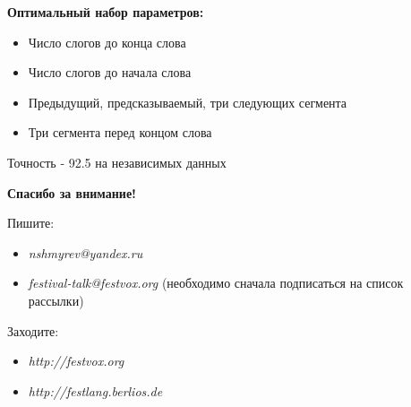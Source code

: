 \documentclass{seminar}
\begin{document}
\begin{slide}
{\bf Оптимальный набор параметров:}

\begin{itemize}
\item Число слогов до конца слова
\item Число слогов до начала слова
\item Предыдущий, предсказываемый, три следующих сегмента
\item Три сегмента перед концом слова
\end{itemize}

Точность - 92.5 на независимых данных

\end{slide}

\begin{slide}

{\bf Спасибо за внимание!}

Пишите:

\begin{itemize}
\item \textit{nshmyrev@yandex.ru}
\item \textit{festival-talk@festvox.org} {\small (необходимо сначала подписаться на список рассылки)}
\end{itemize}

Заходите:

\begin{itemize}
\item \textit{http://festvox.org}
\item \textit{http://festlang.berlios.de}
\end{itemize}

\end{slide}
\end{document}
